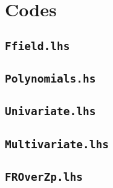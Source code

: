 \documentclass[11pt]{book}
\begin{document}

\chapter{Codes}
\section{\texttt{Ffield.lhs}}


\section{\texttt{Polynomials.hs}}


\section{\texttt{Univariate.lhs}}


\section{\texttt{Multivariate.lhs}}


\section{\texttt{FROverZp.lhs}}

\end{document}
